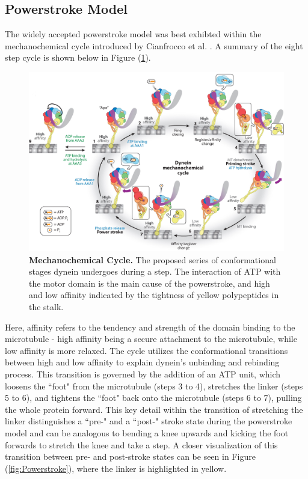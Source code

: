 \subsection{Powerstroke Model}

The widely accepted powerstroke model was best exhibted within the mechanochemical cycle introduced by Cianfrocco et al. \cite{Cianfrocco2015mechanism}. A summary of the eight step cycle is shown below in Figure (\ref{fig:MechanochemicalCycle}).

\begin{figure}[H]
	\centering
	\includegraphics[width=1\columnwidth]{Figures/mechanochemical_cycle.jpeg}
	\caption[Mechanochemical Cycle]{\textbf{Mechanochemical Cycle.} The proposed series of conformational stages dynein undergoes during a step. The interaction of ATP with the motor domain is the main cause of the powerstroke, and high and low affinity indicated by the tightness of yellow polypeptides in the stalk. \cite{Cianfrocco2015mechanism}}
	\label{fig:MechanochemicalCycle}
\end{figure}

Here, affinity refers to the tendency and strength of the domain binding to the microtubule - high affinity being a secure attachment to the microtubule, while low affinity is more relaxed. The cycle utilizes the conformational transitions between high and low affinity to explain dynein's unbinding and rebinding process. This transition is governed by the addition of an ATP unit, which loosens the ``foot" from the microtubule (steps 3 to 4), stretches the linker (steps 5 to 6), and tightens the ``foot" back onto the microtubule (steps 6 to 7), pulling the whole protein forward. This key detail within the transition of stretching the linker distinguishes a ``pre-" and a ``post-" stroke state during the powerstroke model and can be analogous to bending a knee upwards and kicking the foot forwards to stretch the knee and take a step. A closer visualization of this transition between pre- and post-stroke states can be seen in Figure (\ref{fig:Powerstroke}), where the linker is highlighted in yellow.  

